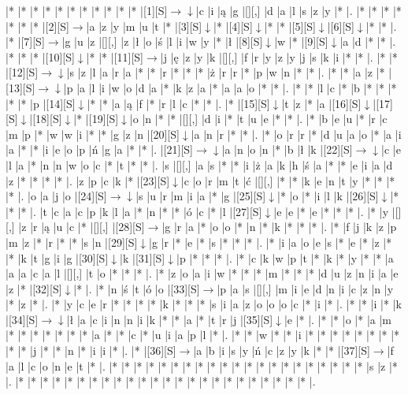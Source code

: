 \documentclass[11pt]{article}
\newcommand\drarr{$\rightarrow \!\!\!\!\! \downarrow$}
\newcommand\rarr{$\rightarrow$}
\newcommand\darr{$\downarrow$}
\begin{document}
\noindent\begin{Puzzle}{23}{27}|*	|*	|*	|*	|*	|*	|*	|*	|*	|*	|*	|[1][S]\drarr	|c	|i	|ą	|g	|[][,]{ }	|d	|a	|l	|s	|z	|y	|*	|.
|*	|*	|*	|*	|*	|*	|*	|[2][S]\rarr	|a	|z	|y	|m	|u	|t	|*	|[3][S]\darr	|*	|[4][S]\darr	|*	|*	|[5][S]\darr	|[6][S]\darr	|*	|*	|.
|*	|[7][S]\rarr	|g	|u	|z	|[][,]{ }	|z	|ł	|o	|ś	|l	|i	|w	|y	|*	|ł	|[8][S]\darr	|w	|*	|[9][S]\darr	|a	|d	|*	|*	|.
|*	|*	|*	|[10][S]\darr	|*	|*	|[11][S]\rarr	|j	|ę	|z	|y	|k	|[][,]{ }	|f	|r	|y	|z	|y	|j	|s	|k	|i	|*	|*	|.
|*	|*	|[12][S]\drarr	|s	|z	|l	|a	|r	|a	|*	|*	|r	|*	|*	|*	|ż	|r	|r	|*	|p	|w	|n	|*	|*	|.
|*	|*	|a	|z	|*	|[13][S]\drarr	|p	|a	|l	|i	|w	|o	|d	|a	|*	|k	|z	|a	|*	|a	|a	|o	|*	|*	|.
|*	|*	|l	|c	|*	|b	|*	|*	|*	|*	|*	|p	|[14][S]\darr	|*	|*	|a	|ą	|f	|*	|r	|l	|c	|*	|*	|.
|*	|[15][S]\darr	|t	|z	|*	|a	|[16][S]\darr	|[17][S]\darr	|[18][S]\darr	|*	|[19][S]\darr	|o	|n	|*	|*	|[][,]{ }	|d	|i	|*	|t	|u	|e	|*	|*	|.
|*	|b	|e	|u	|*	|r	|c	|m	|p	|*	|w	|w	|i	|*	|*	|g	|z	|n	|[20][S]\darr	|a	|n	|r	|*	|*	|.
|*	|o	|r	|r	|*	|d	|u	|a	|o	|*	|a	|i	|a	|*	|*	|i	|e	|o	|p	|ń	|g	|a	|*	|*	|.
|[21][S]\drarr	|a	|n	|o	|n	|*	|b	|ł	|k	|[22][S]\drarr	|c	|e	|l	|a	|*	|n	|n	|w	|o	|c	|*	|t	|*	|*	|.
|s	|[][,]{ }	|a	|s	|*	|*	|i	|ż	|a	|k	|h	|ś	|a	|*	|*	|e	|i	|a	|d	|z	|*	|*	|*	|*	|.
|z	|p	|c	|k	|*	|[23][S]\darr	|c	|o	|r	|m	|t	|ć	|[][,]{ }	|*	|*	|k	|e	|n	|t	|y	|*	|*	|*	|*	|.
|o	|a	|j	|o	|[24][S]\drarr	|s	|u	|r	|m	|i	|a	|*	|g	|[25][S]\darr	|*	|o	|*	|i	|l	|k	|[26][S]\darr	|*	|*	|*	|.
|t	|c	|a	|c	|p	|k	|l	|a	|*	|n	|*	|*	|ó	|c	|*	|l	|[27][S]\darr	|e	|e	|*	|e	|*	|*	|*	|.
|*	|y	|[][,]{ }	|z	|r	|ą	|u	|c	|*	|[][,]{ }	|[28][S]\rarr	|g	|r	|a	|*	|o	|o	|*	|n	|*	|k	|*	|*	|*	|.
|*	|f	|j	|k	|z	|p	|m	|z	|*	|r	|*	|*	|s	|n	|[29][S]\darr	|g	|r	|*	|e	|*	|s	|*	|*	|*	|.
|*	|i	|a	|o	|e	|s	|*	|e	|*	|z	|*	|*	|k	|t	|g	|i	|g	|[30][S]\darr	|k	|[31][S]\darr	|p	|*	|*	|*	|.
|*	|c	|k	|w	|p	|t	|*	|k	|*	|y	|*	|*	|a	|a	|a	|c	|a	|l	|[][,]{ }	|t	|o	|*	|*	|*	|.
|*	|z	|o	|a	|i	|w	|*	|*	|*	|m	|*	|*	|*	|d	|u	|z	|n	|i	|a	|e	|z	|*	|[32][S]\darr	|*	|.
|*	|n	|ś	|t	|ó	|o	|[33][S]\rarr	|p	|a	|s	|[][,]{ }	|m	|i	|e	|d	|n	|i	|c	|z	|n	|y	|*	|z	|*	|.
|*	|y	|c	|e	|r	|*	|*	|*	|*	|k	|*	|*	|*	|s	|i	|a	|z	|o	|o	|o	|c	|*	|i	|*	|.
|*	|*	|i	|*	|k	|[34][S]\drarr	|ł	|a	|c	|i	|n	|n	|i	|k	|*	|*	|a	|*	|t	|r	|j	|[35][S]\darr	|e	|*	|.
|*	|*	|o	|*	|a	|m	|*	|*	|*	|*	|*	|*	|*	|a	|*	|*	|c	|*	|u	|i	|a	|p	|l	|*	|.
|*	|*	|w	|*	|*	|i	|*	|*	|*	|*	|*	|*	|*	|*	|*	|*	|j	|*	|*	|n	|*	|i	|i	|*	|.
|*	|[36][S]\rarr	|a	|b	|i	|s	|y	|ń	|c	|z	|y	|k	|*	|*	|[37][S]\rarr	|f	|a	|l	|c	|o	|n	|e	|t	|*	|.
|*	|*	|*	|*	|*	|*	|*	|*	|*	|*	|*	|*	|*	|*	|*	|*	|*	|*	|*	|*	|*	|s	|z	|*	|.
|*	|*	|*	|*	|*	|*	|*	|*	|*	|*	|*	|*	|*	|*	|*	|*	|*	|*	|*	|*	|*	|*	|*	|*	|.\end{Puzzle}
\end{document}
